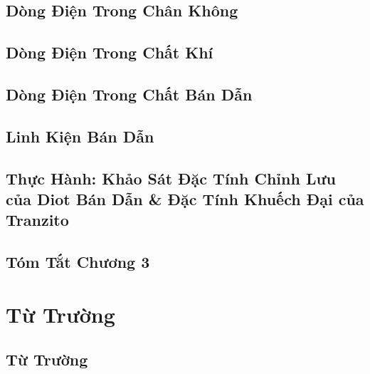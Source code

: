 \documentclass[oneside]{book}
\numberwithin{equation}{section}
\begin{document}

\section{Dòng Điện Trong Chân Không}


\section{Dòng Điện Trong Chất Khí}


\section{Dòng Điện Trong Chất Bán Dẫn}


\section{Linh Kiện Bán Dẫn}


\section{Thực Hành: Khảo Sát Đặc Tính Chỉnh Lưu của Diot Bán Dẫn \& Đặc Tính Khuếch Đại của Tranzito}


\section{Tóm Tắt Chương 3}


\chapter{Từ Trường}

\section{Từ Trường}
\end{document}
